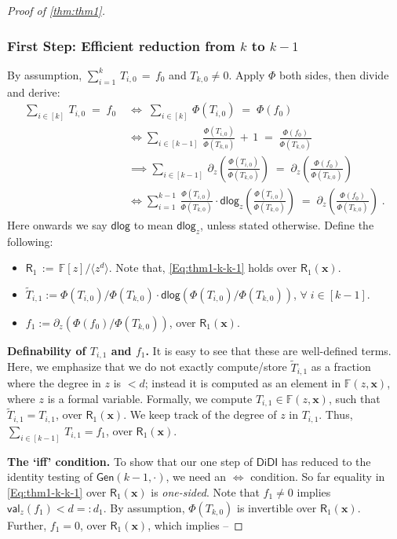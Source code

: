 \documentclass[10pt,a4paper]{article}
\newcommand{\DiDI}{\mathsf{DiDI}}
\newcommand{\F}{\mathbb{F}}
\newcommand{\ringR}{\mathsf{R}}
\newcommand{\x}{{\boldsymbol x}}
\newcommand{\val}{\mathsf{val}}
\newcommand{\dlg}{\mathsf{dlog}}
\newcommand{\Gen}[2]{\mathsf{Gen}(#1,#2)}
\numberwithin{equation}{section}
\begin{document}
\begin{proof}[Proof of \autoref{thm:thm1}]
\subsubsection*{First Step: Efficient reduction from $k$ to $k-1$}
By assumption, $\sum_{i=1}^k\,T_{i,0}\,=\,f_{0}$ and $T_{k,0}\ne0$. Apply $\Phi$ both sides, then divide and derive:
\begin{align} \label{Eq:thm1-k-k-1}
    \sum_{i \in [k]}\,T_{i,0} \;=\; f_0 \; &\iff\;  \sum_{i \in [k]}\,\Phi(T_{i,0}) \;=\; \Phi(f_0) \nonumber\\ 
    &\iff  \sum_{i \in [k-1]}\, \frac{\Phi(T_{i,0})}{\Phi(T_{k,0})}\,+\, 1 \;=\; \frac{\Phi(f_0)}{\Phi(T_{k,0})} \nonumber\\ 
    &\implies \sum_{i \in [k-1]}\,\partial_{z} \left( \frac{\Phi(T_{i,0})}{\Phi(T_{k,0})}\right) \;=\; \partial_{z}\left(\frac{\Phi(f_0)}{\Phi(T_{k,0})}\right) \nonumber\\ 
&\iff \sum_{i=1}^{k-1}\,\frac{\Phi(T_{i,0})}{\Phi(T_{k,0})} \cdot \dlg_{z} \left( \frac{\Phi(T_{i,0})}{\Phi(T_{k,0})} \right) \;=\; \partial_{z} \left( \frac{\Phi(f_0)}{\Phi(T_{k,0})}\right)\;.
\end{align}
Here onwards we say \(\dlg\) to mean \(\dlg_z\), unless stated otherwise. Define the following:
\begin{itemize}
    \setlength\itemsep{1em}
    \item $\ringR_1\,:=\, \F[z]/\langle z^{d} \rangle$. Note that, \autoref{Eq:thm1-k-k-1} holds over $\ringR_1(\x)$.
    \item $\widetilde{T}_{i,1}:=\Phi(T_{i,0})/\Phi(T_{k,0}) \cdot \dlg (\Phi(T_{i,0})/\Phi(T_{k,0}))$, $\forall\;i \in [k-1]$.
    \item $ f_{1}:=\partial_{z}(\Phi(f_0)/\Phi(T_{k,0}))$, over $\ringR_1(\x)$.
\end{itemize}
\vspace*{1em}

\textbf{Definability of $T_{i,1}$ and $f_1$.} It is easy to see that these are well-defined terms. Here, we emphasize that we do not exactly compute/store $\widetilde{T}_{i,1}$ as a fraction where the degree in $z$ is $<d$; instead it is computed as an element in $\F(z,\x)$, where $z$ is a formal variable. Formally, we compute $T_{i,1} \in \F(z,\x)$, such that $\widetilde{T}_{i,1} = T_{i,1}$, over $\ringR_1(\x)$. We keep track of the degree of $z$ in $T_{i,1}$. 
Thus, $\sum_{i \in [k-1]}\,T_{i,1}=f_1$, over $\ringR_1(\x)$.

\vspace*{1em}
\textbf{The `iff' condition.} To show that our one step of $\DiDI$ has reduced to the identity testing of $\Gen{k-1}{\cdot}$, we need an $\iff$ condition. So far equality in \autoref{Eq:thm1-k-k-1} over $\ringR_1(\x)$ is \emph{one-sided}. Note that $f_{1} \ne 0$ implies $\val_{z}(f_{1}) < d=:d_1$. By assumption, $\Phi(T_{k,0})$ is invertible over $\ringR_1(\x)$. Further, $f_{1} = 0$, over $\ringR_1(\x)$, which implies --


\end{proof}
\end{document}
